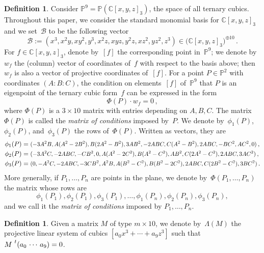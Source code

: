 \documentclass[a4paper, 11pt, reqno]{amsart}
\theoremstyle{plain}
\theoremstyle{definition}
\newtheorem{definition}[lemma]{Definition}
\newcommand{\C}{\mathbb{C}}
\newcommand{\p}{\mathbb{P}}
\newcommand\scalemath[2]{\scalebox{#1}{\mbox{\ensuremath{\displaystyle #2}}}}
\begin{document}
\begin{definition}
\label{definition:matrix_conditions}
Consider $\p^9 = \p(\C[x,y,z]_3)$, the space of all ternary cubics.
Throughout this paper, we consider the standard monomial basis for $\C[x,y,z]_3$ and we set~$\mathcal{B}$ to be the following vector
%
\begin{equation}
\label{eq:vector_basis}
  \mathcal{B} := (x^3, x^2 y, x y^2, y^3, x^2 z, x y z, y^2 z, x z^2, y z^2, z^3)
  \in \bigl( \C[x,y,z]_3 \bigr)^{\oplus 10} \,.
\end{equation}
For $f \in \C[x,y,z]_3$, denote by~$[f]$ the corresponding point in~$\p^9$; we denote by~$w_f$ the (column) vector of coordinates of~$f$ with respect to the basis above; then $w_f$ is also a vector of projective coordinates of~$[f]$.
For a point $P \in \p^2$ with coordinates $(A: B: C)$, the condition on elements~$[f]$ of~$\p^9$ that $P$ is an eigenpoint of the ternary cubic form~$f$ can be expressed in the form
%
\[
  \Phi(P) \cdot w_f = 0 \,,
\]
%
where $\Phi(P)$ is a $3 \times 10$ matrix with entries depending on $A, B, C$.
The matrix $\Phi(P)$ is called the \emph{matrix of conditions} imposed by~$P$.
We denote by~$\phi_1(P)$, $\phi_2(P)$, and~$\phi_3(P)$ the rows of~$\Phi(P)$.
Written as vectors, they are
%
\begin{equation}
\label{equation:matrix_conditions_rows}
  \begin{aligned}
    \phi_1(P) &=
    \scalemath{0.9}{
    (-3A^2B, A(A^2 - 2B^2), B(2A^2 - B^2), 3AB^2,
     -2ABC, C(A^2 - B^2), 2 ABC,
     -B C^2, A C^2, 0)} \,, \\
    \phi_2(P) &= 
    \scalemath{0.9}{
    (-3A^2 C,
     -2ABC,
     -CB^2,
     0,
     A(A^2-2C^2),
     B(A^2 - C^2),
     AB^2,
     C(2A^2-C^2),
     2ABC,
     3AC^2)} \,,\\
    \phi_3(P) &=
    \scalemath{0.9}{
    (0,
     -A^2C,
     -2ABC,
     -3CB^2,
     A^2 B,
     A(B^2 - C^2),
     B(B^2-2C^2),
     2ABC,
     C(2B^2-C^2),
     3BC^2)} \,.
  \end{aligned}
\end{equation}
%
More generally, if $P_1, \dotsc, P_n$ are points in the plane, we denote by~$\Phi(P_1, \dotsc, P_n)$ the matrix whose rows are
%
\[
  \phi_1(P_1), \phi_2(P_1), \phi_3(P_1),
  \dotsc, 
  \phi_1(P_n), \phi_2(P_n), \phi_3(P_n),
\]
%
and we call it the
\emph{matrix of conditions} imposed by $P_1, \dotsc, P_n$.
\end{definition}

\begin{definition}
Given a matrix $M$ of type $m \times 10$, we denote by~$\Lambda(M)$ the projective linear system of cubics $[a_0 x^3 + \dotsb + a_9 z^3]$ such that $M \, \prescript{t}{}{\left( a_0 \,  \cdots \,  a_9 \right)} = 0$.
\end{definition}
\end{document}

